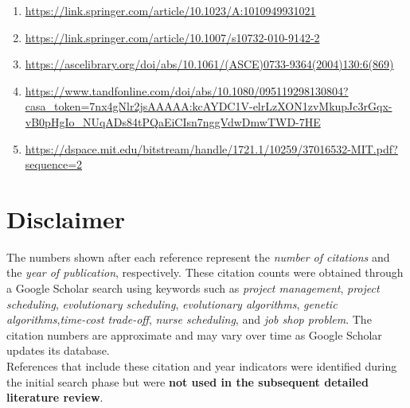 \documentclass[a4paper,12pt]{article}
\begin{document}
\begin{enumerate}
  \item \url{https://link.springer.com/article/10.1023/A:1010949931021}
  \item \url{https://link.springer.com/article/10.1007/s10732-010-9142-2}
  \item \url{https://ascelibrary.org/doi/abs/10.1061/(ASCE)0733-9364(2004)130:6(869)}
  \item \url{https://www.tandfonline.com/doi/abs/10.1080/095119298130804?casa_token=7nx4gNlr2jsAAAAA:kcAYDC1V-elrLzXON1zvMkupJc3rGqx-vB0pHgIo_NUqADs84tPQaEiCIsn7nggVdwDmwTWD-7HE}
  \item \url{https://dspace.mit.edu/bitstream/handle/1721.1/10259/37016532-MIT.pdf?sequence=2}
\end{enumerate}

\section*{Disclaimer}
The numbers shown  after each reference represent the \textit{number of citations} and the \textit{year of publication}, respectively. These citation counts were obtained through a Google Scholar search using keywords such as \textit{project management}, \textit{project scheduling}, \textit{evolutionary scheduling}, \textit{evolutionary algorithms}, \textit{genetic algorithms},\textit{time-cost trade-off}, \textit{nurse scheduling}, and \textit{job shop problem}. The citation numbers are approximate and may vary over time as Google Scholar updates its database.
\\
References that include these citation and year indicators were identified during the initial search phase but were \textbf{not used in the subsequent detailed literature review}.
\end{document}
